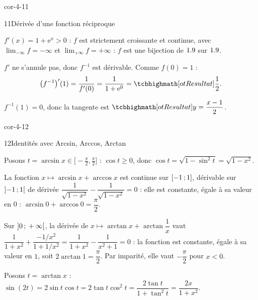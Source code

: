 \begin{blocLivre}{cor-4-11}
\begin{corrige}{11}{Dérivée d'une fonction réciproque}
\begin{questions}
  \item $f'(x)=1+\mathrm{e}^{x}>0$ : $f$ est strictement croissante et continue,
    avec $\lim_{-\infty}f=-\infty$ et $\lim_{+\infty}f=+\infty$ : $f$ est
    une bijection de $1.9$ sur $1.9$.
  \item $f'$ ne s'annule pas, donc $f^{-1}$ est dérivable. Comme $f(0)=1$ :
    \[
      \bigl(f^{-1}\bigr)'(1)=\frac{1}{f'(0)}=\frac{1}{1+\mathrm{e}^{0}}=\res{\frac12}.
    \]
  \item $f^{-1}(1)=0$, donc la tangente est
    $\res{y=\dfrac{x-1}{2}}$.
\end{questions}
\end{corrige}
\end{blocLivre}

\begin{blocLivre}{cor-4-12}
\begin{corrige}{12}{Identités avec Arcsin, Arccos, Arctan}
\begin{questions}
  \item Posons $t=\arcsin x\in\bigl[-\frac{\pi}{2},\frac{\pi}{2}\bigr]$ :
    $\cos t\geq0$, donc $\cos t=\sqrt{1-\sin^{2}t}=\sqrt{1-x^{2}}$.
  \item La fonction $x\mapsto\arcsin x+\arccos x$ est continue sur
    $\mathopen{[}-1\,{;}\,1\mathclose{]}$, dérivable sur $\mathopen{]}-1\,{;}\,1\mathclose{[}$ de dérivée
    $\dfrac{1}{\sqrt{1-x^{2}}}-\dfrac{1}{\sqrt{1-x^{2}}}=0$ : elle est
    constante, égale à sa valeur en $0$ :
    $\arcsin0+\arccos0=\dfrac{\pi}{2}$.
  \item Sur $\mathopen{]}0\,{;}\,+\infty\mathclose{[}$, la dérivée de
    $x\mapsto\arctan x+\arctan\dfrac1x$ vaut
    $\dfrac{1}{1+x^{2}}+\dfrac{-1/x^{2}}{1+1/x^{2}}=\dfrac{1}{1+x^{2}}-\dfrac{1}{x^{2}+1}=0$ :
    la fonction est constante, égale à sa valeur en $1$, soit
    $2\arctan1=\dfrac{\pi}{2}$. Par imparité, elle vaut $-\dfrac{\pi}{2}$
    pour $x<0$.
  \item Posons $t=\arctan x$ : $\sin(2t)=2\sin t\cos t=2\tan t\cos^{2}t
    =\dfrac{2\tan t}{1+\tan^{2}t}=\dfrac{2x}{1+x^{2}}$.
\end{questions}
\end{corrige}
\end{blocLivre}

